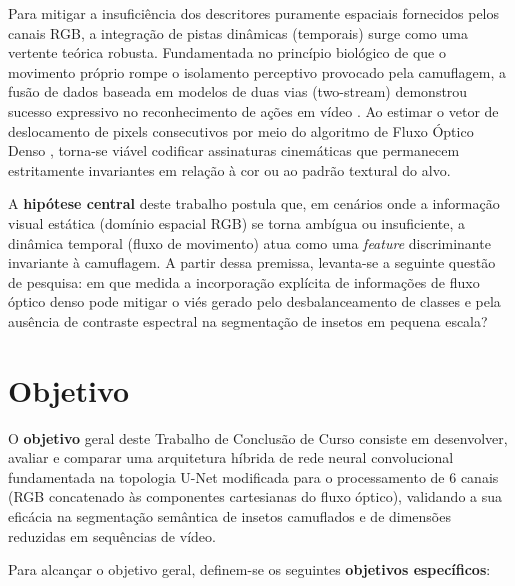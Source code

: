 Para mitigar a insuficiência dos descritores puramente espaciais fornecidos pelos canais RGB, a integração de pistas dinâmicas (temporais) surge como uma vertente teórica robusta. Fundamentada no princípio biológico de que o movimento próprio rompe o isolamento perceptivo provocado pela camuflagem, a fusão de dados baseada em modelos de duas vias (two-stream) demonstrou sucesso expressivo no reconhecimento de ações em vídeo \cite{Simonyan2014}. Ao estimar o vetor de deslocamento de pixels consecutivos por meio do algoritmo de Fluxo Óptico Denso \cite{Farneback2003}, torna-se viável codificar assinaturas cinemáticas que permanecem estritamente invariantes em relação à cor ou ao padrão textural do alvo.

A \textbf{hipótese central} deste trabalho postula que, em cenários onde a informação visual estática (domínio espacial RGB) se torna ambígua ou insuficiente, a dinâmica temporal (fluxo de movimento) atua como uma \textit{feature} discriminante invariante à camuflagem. A partir dessa premissa, levanta-se a seguinte questão de pesquisa: em que medida a incorporação explícita de informações de fluxo óptico denso pode mitigar o viés gerado pelo desbalanceamento de classes e pela ausência de contraste espectral na segmentação de insetos em pequena escala?

\section{Objetivo}

O \textbf{objetivo} geral deste Trabalho de Conclusão de Curso consiste em desenvolver, avaliar e comparar uma arquitetura híbrida de rede neural convolucional fundamentada na topologia U-Net modificada para o processamento de 6 canais (RGB concatenado às componentes cartesianas do fluxo óptico), validando a sua eficácia na segmentação semântica de insetos camuflados e de dimensões reduzidas em sequências de vídeo.

Para alcançar o objetivo geral, definem-se os seguintes \textbf{objetivos específicos}:

